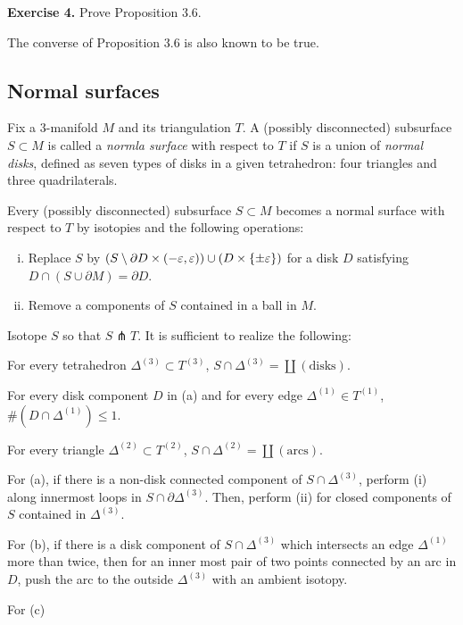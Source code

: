 \documentclass{../../small}
\begin{document}
\noindent\textbf{Exercise 4.} Prove Proposition 3.6.
\begin{rmk*}
The converse of Proposition 3.6 is also known to be true.
\end{rmk*}

\subsection{Normal surfaces}

Fix a 3-manifold $M$ and its triangulation $T$.
A (possibly disconnected) subsurface $S\subset M$ is called a \emph{normla surface} with respect to $T$ if $S$ is a union of \emph{normal disks}, defined as seven types of disks in a given tetrahedron: four triangles and three quadrilaterals.

\begin{prop}
Every (possibly disconnected) subsurface $S\subset M$ becomes a normal surface with respect to $T$ by isotopies and the following operations:
\begin{enumerate}[(i)]
\item Replace $S$ by $(S\setminus\partial D\times(-\varepsilon,\varepsilon))\cup(D\times\{\pm\varepsilon\})$ for a disk $D$ satisfying $D\cap(S\cup\partial M)=\partial D$.
\item Remove a components of $S$ contained in a ball in $M$.
\end{enumerate}
\end{prop}
\begin{pf}
Isotope $S$ so that $S\pitchfork T$.
It is sufficient to realize the following:
\begin{parts}
\item For every tetrahedron $\Delta^{(3)}\subset T^{(3)}$, $S\cap\Delta^{(3)}=\coprod(\text{disks})$.
\item For every disk component $D$ in (a) and for every edge $\Delta^{(1)}\in T^{(1)}$, $\#(D\cap\Delta^{(1)})\le1$.
\item For every triangle $\Delta^{(2)}\subset T^{(2)}$, $S\cap\Delta^{(2)}=\coprod(\text{arcs})$.
\end{parts}

For (a), if there is a non-disk connected component of $S\cap\Delta^{(3)}$, perform (i) along innermost loops in $S\cap\partial\Delta^{(3)}$.
Then, perform (ii) for closed components of $S$ contained in $\Delta^{(3)}$.

For (b), if there is a disk component of $S\cap\Delta^{(3)}$ which intersects an edge $\Delta^{(1)}$ more than twice, then for an inner most pair of two points connected by an arc in $D$, push the arc to the outside $\Delta^{(3)}$ with an ambient isotopy.

For (c)
\end{pf}
\end{document}

